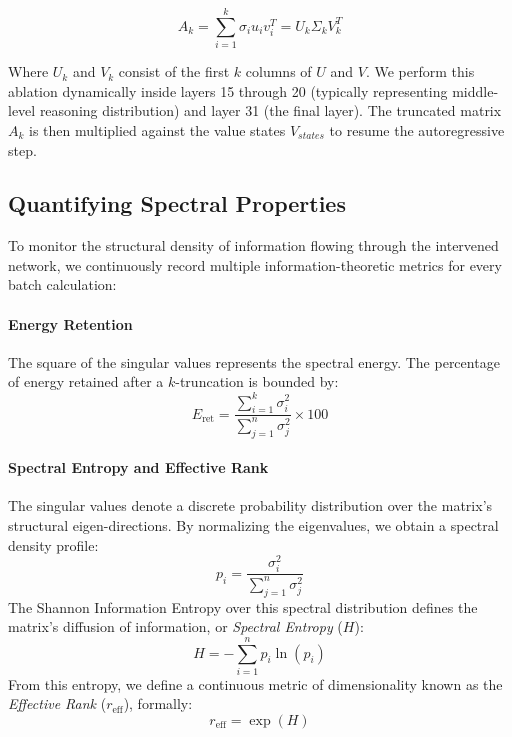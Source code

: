 \documentclass{article}
\begin{document}
\begin{equation}
    A_k = \sum_{i=1}^{k} \sigma_i u_i v_i^T = U_k \Sigma_k V_k^T
\end{equation}

Where $U_k$ and $V_k$ consist of the first $k$ columns of $U$ and $V$. We perform this ablation dynamically inside layers 15 through 20 (typically representing middle-level reasoning distribution) and layer 31 (the final layer). The truncated matrix $A_k$ is then multiplied against the value states $V_{states}$ to resume the autoregressive step.

\subsection{Quantifying Spectral Properties}

To monitor the structural density of information flowing through the intervened network, we continuously record multiple information-theoretic metrics for every batch calculation:

\paragraph{Energy Retention} 
The square of the singular values represents the spectral energy. The percentage of energy retained after a $k$-truncation is bounded by:
\begin{equation}
    E_{\text{ret}} = \frac{\sum_{i=1}^k \sigma_i^2}{\sum_{j=1}^n \sigma_j^2} \times 100
\end{equation}

\paragraph{Spectral Entropy and Effective Rank}
The singular values denote a discrete probability distribution over the matrix's structural eigen-directions. By normalizing the eigenvalues, we obtain a spectral density profile:
\begin{equation}
    p_i = \frac{\sigma_i^2}{\sum_{j=1}^n \sigma_j^2}
\end{equation}
The Shannon Information Entropy over this spectral distribution defines the matrix's diffusion of information, or \textit{Spectral Entropy} ($H$):
\begin{equation}
    H = - \sum_{i=1}^{n} p_i \ln(p_i)
\end{equation}
From this entropy, we define a continuous metric of dimensionality known as the \textit{Effective Rank} ($r_{\text{eff}}$), formally:
\begin{equation}
    r_{\text{eff}} = \exp(H)
\end{equation}
\end{document}
